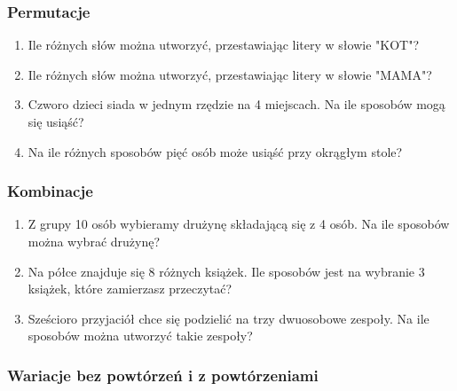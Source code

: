 \documentclass[12pt]{article}
\begin{document}
\subsubsection{Permutacje}

\begin{enumerate}
	\item 
	Ile różnych słów można utworzyć, przestawiając litery w słowie "KOT"?
	
	\item 
	Ile różnych słów można utworzyć, przestawiając litery w słowie "MAMA"?
	
	\item 
	Czworo dzieci siada w jednym rzędzie na 4 miejscach. Na ile sposobów mogą się usiąść?
	
	\item 
	Na ile różnych sposobów pięć osób może usiąść przy okrągłym stole?
\end{enumerate}

\subsubsection{Kombinacje}
\begin{enumerate}
	\item 
	Z grupy 10 osób wybieramy drużynę składającą się z 4 osób. Na ile sposobów można wybrać drużynę?
	\item 
	Na półce znajduje się 8 różnych książek. Ile sposobów jest na wybranie 3 książek, które zamierzasz przeczytać?
	\item 
	Sześcioro przyjaciół chce się podzielić na trzy dwuosobowe zespoły. Na ile sposobów można utworzyć takie zespoły?
\end{enumerate}

\subsubsection{Wariacje bez powtórzeń i z powtórzeniami}
\end{document}
